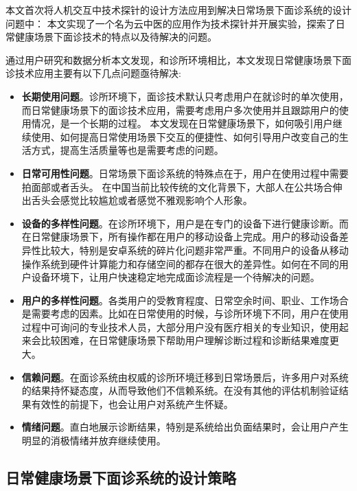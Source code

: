 本文首次将人机交互中技术探针的设计方法应用到解决日常场景下面诊系统的设计问题中：
本文实现了一个名为云中医的应用作为技术探针并开展实验，探索了日常健康场景下面诊技术的特点以及待解决的问题。

通过用户研究和数据分析本文发现，和诊所环境相比，本文发现日常健康场景下面诊技术应用主要有以下几点问题亟待解决: 
\begin{itemize}
    
    \item \textbf{长期使用问题}。诊所环境下，面诊技术默认只考虑用户在就诊时的单次使用，而日常健康场景下的面诊技术应用，需要考虑用户多次使用并且跟踪用户的使用情况，是一个长期的过程。
    本文发现在日常健康场景下，如何吸引用户继续使用、如何提高日常使用场景下交互的便捷性、如何引导用户改变自己的生活方式，提高生活质量等也是需要考虑的问题。
    
    \item \textbf{日常可用性问题}。日常场景下面诊系统的特殊点在于，用户在使用过程中需要拍面部或者舌头。
    在中国当前比较传统的文化背景下，大部人在公共场合伸出舌头会感觉比较尴尬或者感觉不雅观影响个人形象。

    \item \textbf{设备的多样性问题}。在诊所环境下，用户是在专门的设备下进行健康诊断。而在日常健康场景下，所有操作都在用户的移动设备上完成。用户的移动设备差异性比较大，特别是安卓系统的碎片化问题非常严重。不同用户的设备从移动操作系统到硬件计算能力和存储空间的都存在很大的差异性。如何在不同的用户设备环境下，让用户快速稳定地完成面诊流程是一个待解决的问题。
    
    \item \textbf{用户的多样性问题}。各类用户的受教育程度、日常空余时间、职业、工作场合是需要考虑的因素。比如在日常使用的时候，与诊所环境下不同，用户在使用过程中可询问的专业技术人员，大部分用户没有医疗相关的专业知识，使用起来会比较困难，在日常健康场景下帮助用户理解诊断过程和诊断结果难度更大。
        
    \item \textbf{信赖问题}。在面诊系统由权威的诊所环境迁移到日常场景后，许多用户对系统的结果持怀疑态度，从而导致他们不信赖系统。在没有其他的评估机制验证结果有效性的前提下，也会让用户对系统产生怀疑。
    
    \item \textbf{情绪问题}。直白地展示诊断结果，特别是系统给出负面结果时，会让用户产生明显的消极情绪并放弃继续使用。 

\end{itemize}

\subsection{日常健康场景下面诊系统的设计策略}

